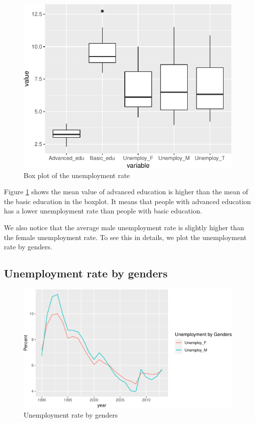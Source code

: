 \documentclass[11pt,a4paper,]{article}
\begin{document}
\begin{figure}[H]

{\centering \includegraphics{Figures/boxplot-1} 

}

\caption{Box plot of the unemployment rate}\label{fig:boxplot}
\end{figure}

Figure \ref{fig:boxplot} shows the mean value of advanced education is higher than the mean of the basic education in the boxplot. It means that people with advanced education has a lower unemployment rate than people with basic education.

We also notice that the average male unemployment rate is slightly higher than the female unemployment rate. To see this in details, we plot the unemployment rate by genders.

\subsection{Unemployment rate by genders}

\begin{figure}[H]

{\centering \includegraphics{Figures/gender-1} 

}

\caption{Unemployment rate by genders}\label{fig:gender}
\end{figure}
\end{document}
